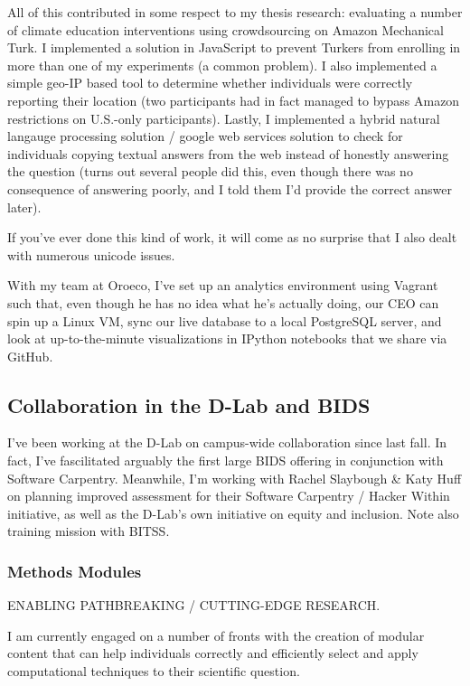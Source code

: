 \documentclass[12pt]{article}
\begin{document}
All of this contributed in some respect to my thesis research: evaluating a
number of climate education interventions using crowdsourcing on Amazon
Mechanical Turk. I implemented a solution in JavaScript to prevent Turkers from
enrolling in more than one of my experiments (a common problem). %
I also implemented a simple geo-IP based tool to determine whether individuals
were correctly reporting their location (two participants had in fact managed to
bypass Amazon restrictions on U.S.-only participants). Lastly, I implemented a
hybrid natural langauge processing solution / google web services solution to
check for individuals copying textual answers from the web instead of honestly
answering the question (turns out several people did this, even though there was
no consequence of answering poorly, and I told them I'd provide the correct
answer later).

If you've ever done this kind of work, it will come as no surprise that I also
dealt with numerous unicode issues.

With my team at Oroeco, I've set up an analytics environment using Vagrant such
that, even though he has no idea what he's actually doing, our CEO can spin up a
Linux VM, sync our live database to a local PostgreSQL server, and look at
up-to-the-minute visualizations in IPython notebooks that we share via GitHub.

\subsection*{Collaboration in the D-Lab and BIDS}

I've been working at the D-Lab on campus-wide collaboration since last fall. In
fact, I've fascilitated arguably the first large BIDS offering in conjunction with Software Carpentry.
Meanwhile, I'm working with Rachel Slaybough \& Katy Huff on planning improved
assessment for their Software Carpentry / Hacker Within initiative, as well as
the D-Lab's own initiative on equity and inclusion. Note also training mission
with BITSS.

\subsubsection*{Methods Modules}

ENABLING PATHBREAKING / CUTTING-EDGE RESEARCH.

I am currently engaged on a number of fronts with the creation of modular
content that can help individuals correctly and efficiently select and apply
computational techniques to their scientific question.
\end{document}
